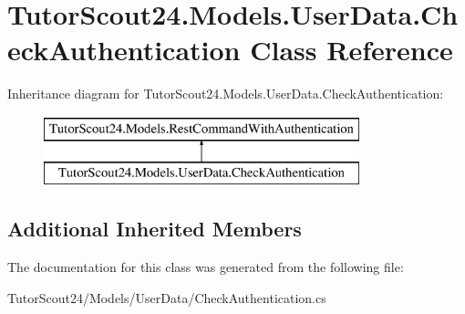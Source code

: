 \hypertarget{class_tutor_scout24_1_1_models_1_1_user_data_1_1_check_authentication}{}\section{Tutor\+Scout24.\+Models.\+User\+Data.\+Check\+Authentication Class Reference}
\label{class_tutor_scout24_1_1_models_1_1_user_data_1_1_check_authentication}
Inheritance diagram for Tutor\+Scout24.\+Models.\+User\+Data.\+Check\+Authentication\+:\begin{figure}[H]
\begin{center}
\leavevmode
\includegraphics[height=2.000000cm]{class_tutor_scout24_1_1_models_1_1_user_data_1_1_check_authentication}
\end{center}
\end{figure}
\subsection*{Additional Inherited Members}


The documentation for this class was generated from the following file\+:\begin{DoxyCompactItemize}
\item 
Tutor\+Scout24/\+Models/\+User\+Data/Check\+Authentication.\+cs\end{DoxyCompactItemize}
